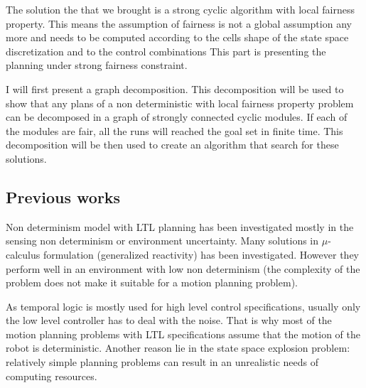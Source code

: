 The solution the that we brought is a strong cyclic algorithm with local fairness property. This means the assumption of fairness is not a global assumption any more and needs to be computed according to the cells shape of the state space discretization and to the control combinations
This part is presenting the planning under strong fairness constraint.

I will first present a graph decomposition. This decomposition will be used to show that any plans of a non deterministic with local fairness property problem can be decomposed in a graph of strongly connected cyclic modules. If each of the modules are fair, all the runs will reached the goal set in finite time.
This decomposition will be then used to create an algorithm that search for these solutions.

%


\subsection{Previous works}
Non determinism model with LTL planning has been investigated mostly in the sensing non determinism or environment uncertainty.
Many solutions in $\mu$-calculus formulation (generalized reactivity) has been investigated. However they perform well in an environment with low non determinism (the complexity of the problem does not make it suitable for a motion planning problem).

As temporal logic is mostly used for high level control specifications, usually only the low level controller has to deal with the noise.
That is why most of the motion planning problems with LTL specifications  assume that the motion of the robot is deterministic.
Another reason lie in the state space explosion problem: relatively simple planning problems can result in an unrealistic needs of computing resources.

